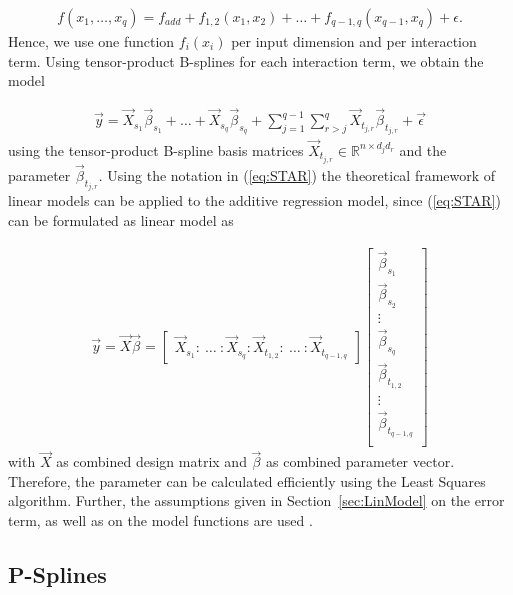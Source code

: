 \documentclass[10pt,a4paper]{report}
\begin{document}
\begin{align} \label{eq:addRegBaseEquation-with-interaction}
	f(x_1, \dots, x_q) = f_{add} + f_{1,2}(x_1, x_2) + \dots + f_{q-1, q}(x_{q-1},x_q) + \epsilon.
\end{align}
%
Hence, we use one function $f_i(x_i)$ per input dimension and per interaction term. Using tensor-product B-splines for each interaction term, we obtain the model

\begin{align} \label{eq:STAR}
	\vec{y} = \vec{X}_{s_1} \vec{\beta}_{s_1} + \dots + \vec{X}_{s_q} \vec{\beta}_{s_q} + \sum_{j=1}^{q-1} \sum_{r>j}^{q} \vec{X}_{t_{j, r}} \vec{\beta}_{t_{j, r}} + \vec{\epsilon}
\end{align}
%
using the tensor-product B-spline basis matrices $\vec{X}_{t_{j,r}} \in \mathbb{R}^{n \times d_j d_r}$ and the parameter $\vec{\beta}_{t_{j, r}}$. Using the notation in (\ref{eq:STAR}) the theoretical framework of linear models can be applied to the additive regression model, since (\ref{eq:STAR}) can be formulated as linear model as

\begin{align} \label{eq:STAR-block-diag}
	\vec{y} = \vec{X} \vec{\beta} = 
	\begin{bmatrix}
		\vec{X}_{s_1} \colon \ \dots \ \colon \vec{X}_{s_q} \colon \vec{X}_{t_{1,2}} \colon \ \dots  \ \colon \vec{X}_{t_{q-1, q}}    
	\end{bmatrix} \begin{bmatrix} \vec{\beta}_{s_1} \\ \vec{\beta}_{s_2} \\ \vdots \\ \vec{\beta}_{s_q} \\ \vec{\beta}_{t_{1,2}} \\ \vdots \\ \vec{\beta}_{t_{q-1, q}} \\
	\end{bmatrix}
\end{align}
%
with $\vec{X}$ as combined design matrix and $\vec{\beta}$ as combined parameter vector. Therefore, the parameter can be calculated efficiently using the Least Squares algorithm. Further, the assumptions given in Section~\ref{sec:LinModel} on the error term, as well as on the model functions are used \cite{fahrmeir2007regression}.

\subsection{P-Splines} \label{subsec:p-splines}
\end{document}
